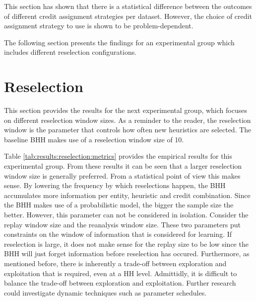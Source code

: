 This section has shown that there is a statistical difference between the outcomes of different credit assignment strategies per dataset. However, the choice of credit assignment strategy to use is shown to be problem-dependent.

The following section presents the findings for an experimental group which includes different reselection configurations.





\section{Reselection}
\label{sec:results:reselection}

This section provides the results for the next experimental group, which focuses on different reselection window sizes. As a reminder to the reader, the reselection window is the parameter that controls how often new heuristics are selected. The baseline \Ac{BHH} makes use of a reselection window size of 10.

Table \ref{tab:results:reselection:metrics} provides the empirical results for this experimental group. From these results it can be seen that a larger reselection window size is generally preferred. From a statistical point of view this makes sense. By lowering the frequency by which reselections happen, the \Ac{BHH} accumulates more information per entity, heuristic and credit combination. Since the \Ac{BHH} makes use of a probabilistic model, the bigger the sample size the better. However, this parameter can not be considered in isolation. Consider the replay window size and the reanalysis window size. These two parameters put constraints on the window of information that is considered for learning. If reselection is large, it does not make sense for the replay size to be low since the \Ac{BHH} will just forget information before reselection has occured. Furthermore, as mentioned before, there is inherently a trade-off between exploration and exploitation that is required, even at a \ac{HH} level. Admittidly, it is difficult to balance the trade-off between exploration and exploitation. Further research could investigate dynamic techniques such as parameter schedules.

